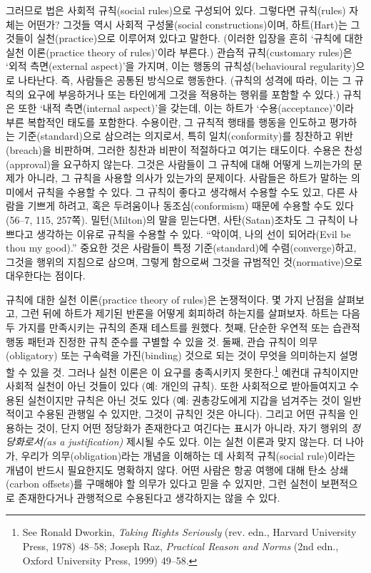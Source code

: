 \documentclass[12pt, oneside]{book}  %
\begin{document}
그러므로 법은 사회적 규칙(social rules)으로 구성되어 있다. 그렇다면
규칙(rules) 자체는 어떤가? 그것들 역시 사회적 구성물(social
constructions)이며, 하트(Hart)는 그것들이 실천(practice)으로 이루어져
있다고 말한다. (이러한 입장을 흔히 `규칙에 대한 실천 이론(practice
theory of rules)'이라 부른다.) 관습적 규칙(customary rules)은 `외적
측면(external aspect)'을 가지며, 이는 행동의 규칙성(behavioural
regularity)으로 나타난다. 즉, 사람들은 공통된 방식으로 행동한다. (규칙의
성격에 따라, 이는 그 규칙의 요구에 부응하거나 또는 타인에게 그것을
적용하는 행위를 포함할 수 있다.) 규칙은 또한 `내적 측면(internal
aspect)'을 갖는데, 이는 하트가 `수용(acceptance)'이라 부른 복합적인
태도를 포함한다. 수용이란, 그 규칙적 행태를 행동을 인도하고 평가하는
기준(standard)으로 삼으려는 의지로서, 특히 일치(conformity)를 칭찬하고
위반(breach)을 비판하며, 그러한 칭찬과 비판이 적절하다고 여기는
태도이다. 수용은 찬성(approval)을 요구하지 않는다. 그것은 사람들이 그
규칙에 대해 어떻게 느끼는가의 문제가 아니라, 그 규칙을 사용할 의사가
있는가의 문제이다. 사람들은 하트가 말하는 의미에서 규칙을 수용할 수
있다. 그 규칙이 좋다고 생각해서 수용할 수도 있고, 다른 사람을 기쁘게
하려고, 혹은 두려움이나 동조심(conformism) 때문에 수용할 수도 있다
(56--7, 115, 257쪽). 밀턴(Milton)의 말을 믿는다면, 사탄(Satan)조차도 그
규칙이 나쁘다고 생각하는 이유로 규칙을 수용할 수 있다. ``악이여, 나의
선이 되어라(Evil be thou my good).'' 중요한 것은 사람들이 특정
기준(standard)에 수렴(converge)하고, 그것을 행위의 지침으로 삼으며,
그렇게 함으로써 그것을 규범적인 것(normative)으로 대우한다는 점이다.

규칙에 대한 실천 이론(practice theory of rules)은 논쟁적이다. 몇 가지
난점을 살펴보고, 그런 뒤에 하트가 제기된 반론을 어떻게 회피하려 하는지를
살펴보자. 하트는 다음 두 가지를 만족시키는 규칙의 존재 테스트를 원했다.
첫째, 단순한 우연적 또는 습관적 행동 패턴과 진정한 규칙 준수를 구별할 수
있을 것. 둘째, 관습 규칙이 의무(obligatory) 또는 구속력을 가진(binding)
것으로 되는 것이 무엇을 의미하는지 설명할 수 있을 것. 그러나 실천 이론은
이 요구를 충족시키지 못한다.\footnote{See Ronald Dworkin, \emph{Taking
  Rights Seriously} (rev. edn., Harvard University Press, 1978) 48--58;
  Joseph Raz, \emph{Practical Reason and Norms} (2nd edn., Oxford
  University Press, 1999) 49--58.} 예컨대 규칙이지만 사회적 실천이 아닌
것들이 있다 (예: 개인의 규칙). 또한 사회적으로 받아들여지고 수용된
실천이지만 규칙은 아닌 것도 있다 (예: 권총강도에게 지갑을 넘겨주는 것이
일반적이고 수용된 관행일 수 있지만, 그것이 규칙인 것은 아니다). 그리고
어떤 규칙을 인용하는 것이, 단지 어떤 정당화가 존재한다고 여긴다는 표시가
아니라, 자기 행위의 \emph{정당화로서(as a justification)} 제시될 수도
있다. 이는 실천 이론과 맞지 않는다. 더 나아가, 우리가
의무(obligation)라는 개념을 이해하는 데 사회적 규칙(social rule)이라는
개념이 반드시 필요한지도 명확하지 않다. 어떤 사람은 항공 여행에 대해
탄소 상쇄(carbon offsets)를 구매해야 할 의무가 있다고 믿을 수 있지만,
그런 실천이 보편적으로 존재한다거나 관행적으로 수용된다고 생각하지는
않을 수 있다.
\end{document}
